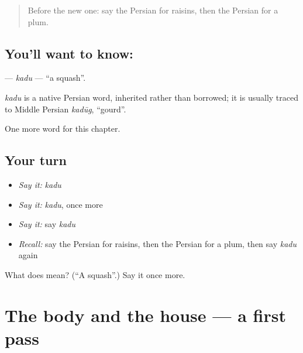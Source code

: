 \label{lesson:FA-C118-kadu}



\begin{quote}
Before the new one: say the Persian for raisins, then the Persian for a plum.
\end{quote}

\subsection*{You'll want to know: }
\textbf{} — \emph{kadu} — \textquotedblleft{}a squash\textquotedblright{}.

\begin{cousinweb}
\emph{kadu} is a native Persian word, inherited rather than borrowed; it is usually traced to Middle Persian \emph{kadūg}, \textquotedblleft{}gourd\textquotedblright{}.
\end{cousinweb}

\begin{grammarlens}[title={What you've built}]
One more word for this chapter.
\end{grammarlens}

\subsection*{Your turn}
\begin{itemize}
\raggedright
  \item \emph{Say it:} \emph{kadu}
  \item \emph{Say it:} \emph{kadu}, once more
  \item \emph{Say it:} say \emph{kadu}
  \item \emph{Recall:} say the Persian for raisins, then the Persian for a plum, then say \emph{kadu} again
\end{itemize}

\begin{tcolorbox}[breakable,colback=teal!4,colframe=teal!35!black,title={Before you move on}]
What does  mean? (\textquotedblleft{}A squash\textquotedblright{}.) Say it once more.
\end{tcolorbox}
\section[(dialogue)]{The body and the house — a first pass}

\label{lesson:FA-R118-first-pass-the-body-and-the-house}



